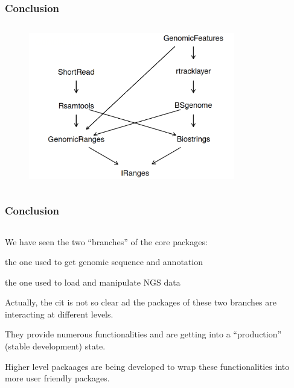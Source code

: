 \documentclass{beamer}
\begin{document}

\begin{frame}
\frametitle{Conclusion}
\begin{column}{1\textwidth}
      \begin{figure}[ht]
      \centering
      \includegraphics[width=90mm]{diagramas/Seleccio_012.png}
      \end{figure}
  \end{column}
\end{frame}


\begin{frame}
\frametitle{Conclusion}
\begin{column}{1\textwidth}
  \bit
      \item We have seen the two ``branches'' of the core packages:
        \bit
            \item the one used to get genomic sequence and annotation
            \item the one used to load and manipulate NGS data
        \eit
      \item Actually, the cit is not so clear ad the packages of these two branches are interacting at different levels.
      \item They provide numerous functionalities and are getting into a ``production'' (stable development) state.
      \item Higher level packaages are being developed to wrap these functionalities into more user friendly packages.
  \eit
  \end{column}
\end{frame}

\end{document}
